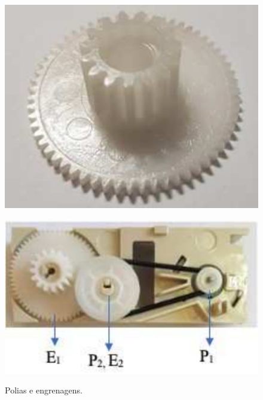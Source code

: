 \documentclass{textolivre-html}
\begin{document}
\begin{enumerate}
\begin{figure}[h!]
\begin{minipage}{0.2\textwidth}
    \label{fig17b}
    \end{minipage}
    \hfill
    \begin{minipage}{0.2\textwidth} 
    \includegraphics[width=\linewidth]{figure-26.pdf}
    \label{fig17c}
    \end{minipage}
    \hfill
    \begin{minipage}{0.33\textwidth} 
    \includegraphics[width=\linewidth]{figure-27.pdf}
    \label{fig17d}
    \end{minipage}
    \caption{Polias e engrenagens.}
    \label{fig17}
    \end{figure}


\end{enumerate}
\end{document}
